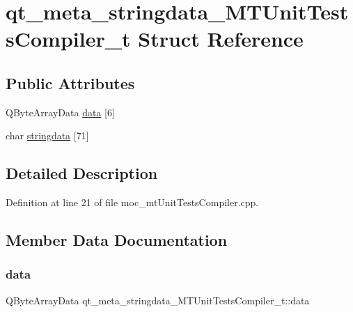 \hypertarget{structqt__meta__stringdata___m_t_unit_tests_compiler__t}{}\section{qt\+\_\+meta\+\_\+stringdata\+\_\+\+M\+T\+Unit\+Tests\+Compiler\+\_\+t Struct Reference}
\label{structqt__meta__stringdata___m_t_unit_tests_compiler__t}
\subsection*{Public Attributes}
\begin{DoxyCompactItemize}
\item 
Q\+Byte\+Array\+Data \mbox{\hyperlink{structqt__meta__stringdata___m_t_unit_tests_compiler__t_a608d276c3cc54a1365243892af84a562}{data}} \mbox{[}6\mbox{]}
\item 
char \mbox{\hyperlink{structqt__meta__stringdata___m_t_unit_tests_compiler__t_a86fa0a4aa69d55de8577922974d0aea5}{stringdata}} \mbox{[}71\mbox{]}
\end{DoxyCompactItemize}


\subsection{Detailed Description}


Definition at line 21 of file moc\+\_\+mt\+Unit\+Tests\+Compiler.\+cpp.



\subsection{Member Data Documentation}
\mbox{\label{structqt__meta__stringdata___m_t_unit_tests_compiler__t_a608d276c3cc54a1365243892af84a562}} 
\subsubsection{\texorpdfstring{data}{data}}
{\footnotesize\ttfamily Q\+Byte\+Array\+Data qt\+\_\+meta\+\_\+stringdata\+\_\+\+M\+T\+Unit\+Tests\+Compiler\+\_\+t\+::data}



